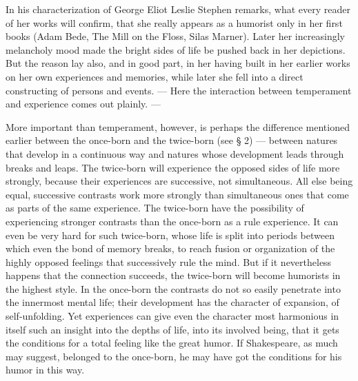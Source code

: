 \documentclass[12pt]{book}
\newcommand{\opage}[1]{\marginnote{\footnotesize\textit{[#1]}}}
\begin{document}
In his characterization of George Eliot Leslie Stephen remarks, what every reader of her works
will confirm, that she really appears as a humorist only in her first books (Adam Bede, The
Mill on the Floss, Silas Marner). Later her increasingly melancholy mood made the bright sides
of life be pushed back in her depictions. But the reason lay also, and in good part, in her
having built in her earlier works on her own experiences and memories, while later she fell
into a direct constructing of persons and events. --- Here the interaction between
temperament and experience comes out plainly. ---

More important than temperament, however, is perhaps the difference mentioned earlier between
the once-born and the twice-born (see § 2) --- between natures that develop in a continuous way
and natures whose development leads through breaks and leaps. The twice-born will experience
the opposed sides of life more strongly, because their experiences are successive, not
simultaneous. All else being equal, successive contrasts work more strongly than simultaneous
ones that come as parts of the same experience. The twice-born have the possibility of
experiencing stronger contrasts than the once-born as a rule experience. It can even be very
hard for such twice-born, whose life is split into periods between which even the bond of
memory breaks, to reach fusion or organization of the highly opposed feelings that
successively rule the mind. But if it nevertheless happens that the connection succeeds, the
twice-born will become \opage{141}humorists in the highest style. In the once-born the
contrasts do not so easily penetrate into the innermost mental life; their development has
the character of expansion, of self-unfolding. Yet experiences can give even the character
most harmonious in itself such an insight into the depths of life, into its involved being,
that it gets the conditions for a total feeling like the great humor. If Shakespeare, as much
may suggest, belonged to the once-born, he may have got the conditions for his humor in this
way.
\end{document}
